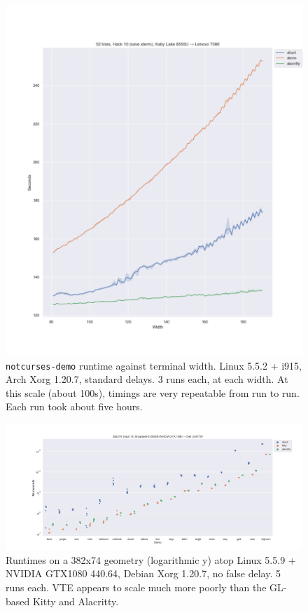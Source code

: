 \begin{figure}[!htb]
\centering
\includegraphics[width=1\textwidth]{media/termsdemo.png}
\caption[Intel i7-8550U benchmarks, varying widths.]{\texttt{notcurses-demo} runtime against terminal width. Linux 5.5.2 + i915, Arch Xorg 1.20.7, standard delays. 3 runs each, at each width.
At this scale (about 100s), timings are very repeatable from run to run. Each run took about five hours.}
\label{fig:intel-full}
\end{figure}

\begin{figure}[!htb]
\centering
\includegraphics[width=1\textwidth]{media/d0-large-nvidia.png}
\caption[382x74 NVIDIA GTX 1080 benchmarks.]{Runtimes on a 382x74 geometry (logarithmic y) atop Linux 5.5.9 + NVIDIA GTX1080 440.64, Debian Xorg 1.20.7, no false delay. 5 runs each. VTE appears to scale much more poorly than the GL-based Kitty and Alacritty.}
\label{fig:nvidia-full}
\end{figure}

